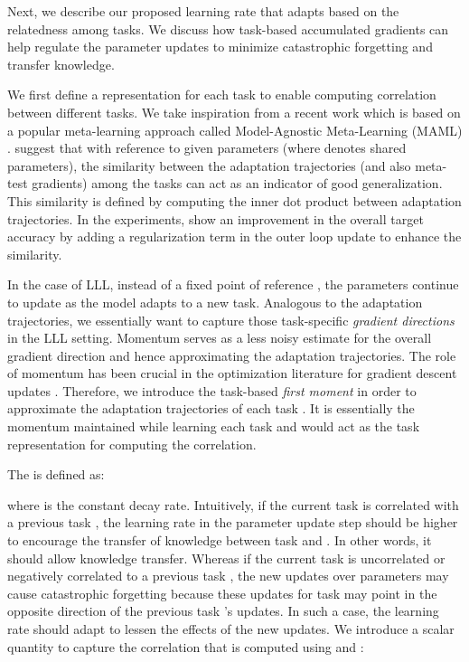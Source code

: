 \documentclass{article} \usepackage{collas2022_conference,times}
\begin{document}
    Next, we describe our proposed learning rate that adapts based on the relatedness among tasks. We discuss how task-based accumulated gradients can help regulate the parameter updates to minimize catastrophic forgetting and transfer knowledge.

We first define a representation for each task to enable computing correlation between different tasks. We take inspiration from a recent work \citep{guiroy2019towards} which is based on a popular meta-learning approach called Model-Agnostic Meta-Learning (MAML) \citep{finn2017model}. \citet{guiroy2019towards} suggest that with reference to given parameters  (where  denotes shared parameters), the similarity between the adaptation trajectories (and also meta-test gradients) among the tasks can act as an indicator of good generalization. This similarity is defined by computing the inner dot product between adaptation trajectories. In the experiments, \citet{guiroy2019towards} show an improvement in the overall target accuracy by adding a regularization term in the outer loop update to enhance the similarity.
    
    In the case of LLL, instead of a fixed point of reference , the parameters continue to update as the model adapts to a new task. Analogous to the adaptation trajectories, we essentially want to capture those task-specific \textit{gradient directions} in the LLL setting. Momentum serves as a less noisy estimate for the overall gradient direction and hence approximating the adaptation trajectories. The role of momentum has been crucial in the optimization literature for gradient descent updates \citep{ruder2016overview,li2017convergence}. Therefore, we introduce the task-based \textit{first moment}  in order to approximate the adaptation trajectories of each task . It is essentially the momentum maintained while learning each task  and would act as the task representation for computing the correlation. 

    The  is defined as: 
 
where  is the constant decay rate. Intuitively, if the current task  is correlated with a previous task , the learning rate in the parameter update step should be higher to encourage the transfer of knowledge between task  and . In other words, it should allow knowledge transfer. Whereas if the current task  is uncorrelated or negatively correlated to a previous task , the new updates over parameters may cause catastrophic forgetting because these updates for task  may point in the opposite direction of the previous task 's updates. In such a case, the learning rate should adapt to lessen the effects of the new updates. We introduce a scalar quantity  to capture the correlation that is computed using  and : 
    
\end{document}
